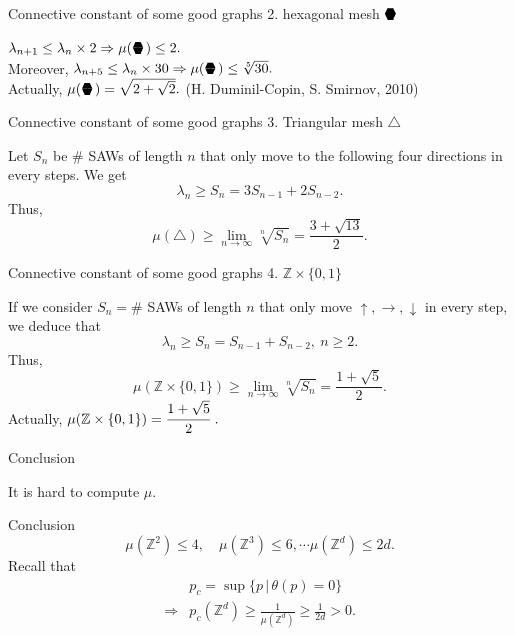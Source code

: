\documentclass{beamer}
\newcommand{\sixedge}{\mbox{\parbox[t][-2pt][c]{10pt}{\scriptsize$\blacktriangledown\hspace{-3.6pt}\blacktriangle\hspace{-4pt}\blacktriangledown$}\hspace{-10.2pt}\parbox[b][10.7pt][c]{10pt}{\scriptsize$\blacktriangle\hspace{-3.6pt}\blacktriangledown\hspace{-3.6pt}\blacktriangle$}}}
\begin{document}
\begin{frame}{Connective constant of some good graphs}
    2. hexagonal mesh $\sixedge$
    \begin{figure}
    \flushleft
    
\end{figure}
    $\lambda_{n+1}\leq \lambda_n\times 2\Rightarrow \mu(\sixedge)\leq 2.$\\
    Moreover, $\lambda_{n+5}\leq \lambda_n\times 30\Rightarrow\mu(\sixedge)\leq \sqrt[5]{30}.$\\[2cm]
    Actually, $\mu(\sixedge)=\sqrt{2+\sqrt{2}}.$ (H. Duminil-Copin, S. Smirnov, 2010)
\end{frame}
\begin{frame}{Connective constant of some good graphs}
    3. Triangular mesh $\triangle$
    \begin{figure}
    \flushleft
    
\end{figure}
Let $S_n$ be \# SAWs of length $n$ that only move to the following four directions in every steps. We get
\[
\lambda_{n}\geq S_n=3S_{n-1}+2S_{n-2}.
\]
Thus,
\[
\mu(\triangle) \geq \lim_{n\to\infty} \sqrt[n]{S_n}=\frac{3+\sqrt{13}}{2}.
\]
\end{frame}
\begin{frame}{Connective constant of some good graphs}
    4. $\mathbb{Z}\times\{0,1\}$
    \begin{figure}
    \flushleft
    
\end{figure}
If we consider $S_n=\#$ SAWs of length $n$ that only move $\uparrow,\rightarrow,\downarrow$ in every step, we deduce that 
\[
\lambda_n\geq S_n=S_{n-1}+S_{n-2},\ n\geq 2.
\]
Thus, 
\[
\mu(\mathbb{Z}\times\{0,1\})\geq\lim_{n\to\infty}\sqrt[n]{S_n}=\frac{1+\sqrt{5}}{2}.
\]
Actually, $\mu(\mathbb{Z}\times\{0,1\})=\cfrac{1+\sqrt{5}}{2}\ .$
\end{frame}
\begin{frame}{Conclusion}
\begin{center}
        It is hard to compute $\mu.$
\end{center}
\end{frame}
\begin{frame}{Conclusion}
    \[
    \mu(\mathbb{Z}^2)\leq 4,\quad \mu(\mathbb{Z}^3)\leq 6,\cdots  \mu(\mathbb{Z}^d)\leq 2d.
    \]
    Recall that 
    \begin{align*}
         &p_c=\sup\{p\, | \, \theta(p)=0\}\\
         \Rightarrow &p_c(\mathbb{Z}^d)\geq\frac{1}{\mu(\mathbb{Z}^d)}\geq \frac{1}{2d}>0.
    \end{align*}
\end{frame}
\end{document}
